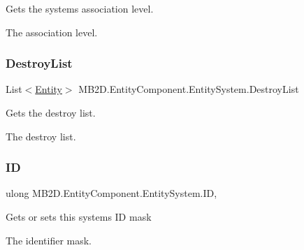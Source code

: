 Gets the systems association level. 

The association level.\hypertarget{class_m_b2_d_1_1_entity_component_1_1_entity_system_a9da3b207e098aa5fcc6ceb2aa3d247d8}{}\label{class_m_b2_d_1_1_entity_component_1_1_entity_system_a9da3b207e098aa5fcc6ceb2aa3d247d8} 
\subsubsection{\texorpdfstring{Destroy\+List}{DestroyList}}
{\footnotesize\ttfamily List$<$\hyperlink{class_m_b2_d_1_1_entity_component_1_1_entity}{Entity}$>$ M\+B2\+D.\+Entity\+Component.\+Entity\+System.\+Destroy\+List\hspace{0.3cm}{\ttfamily [get]}}



Gets the destroy list. 

The destroy list.\hypertarget{class_m_b2_d_1_1_entity_component_1_1_entity_system_a33c31c8fda2901b2bebd71caf39c0d23}{}\label{class_m_b2_d_1_1_entity_component_1_1_entity_system_a33c31c8fda2901b2bebd71caf39c0d23} 
\subsubsection{\texorpdfstring{ID}{ID}}
{\footnotesize\ttfamily ulong M\+B2\+D.\+Entity\+Component.\+Entity\+System.\+ID\hspace{0.3cm}{\ttfamily [get]}, {\ttfamily [set]}}



Gets or sets this systems ID mask 

The identifier mask.\hypertarget{class_m_b2_d_1_1_entity_component_1_1_entity_system_ad78a75cc9b9bd5a4250ea725dbde3300}{}\label{class_m_b2_d_1_1_entity_component_1_1_entity_system_ad78a75cc9b9bd5a4250ea725dbde3300} 
